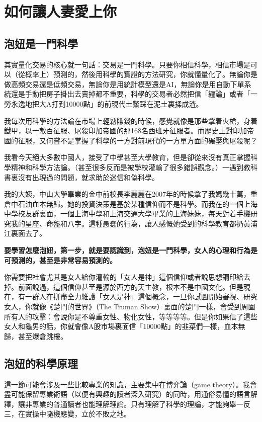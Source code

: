 \chapter{如何讓人妻愛上你}

\section{泡妞是一門科學}

其實量化交易的核心就一句話：交易是一門科學。只要你相信科學，相信市場是可以（從概率上）預測的，然後用科學的實證的方法研究，你就懂量化了。無論你是做高頻交易還是低頻交易，無論你是用統計模型還是AI，無論你是用自動下單系統還是手動把房子掛出去賣掉都不重要，科學的交易者必然把信「纏論」或者「一勞永逸地把大A打到10000點」的前現代土鱉踩在泥土裏揉成渣。

我每次用科學的方法論在市場上輕鬆賺錢的時候，感覺就像是那些拿着火槍，身着鐵甲，以一敵百征服、屠殺印加帝國的那168名西班牙征服者。而歷史上對印加帝國的征服，又何嘗不是掌握了科學的一方對前現代的一方單方面的碾壓與屠殺呢？

我看今天絕大多數中國人，接受了中學甚至大學教育，但是卻從來沒有真正掌握科學精神和科學方法論。（甚至很多反而是被學校灌輸了很多錯誤觀念。）一遇到教科書裏沒有出現過的問題，就求助於迷信和偽科學。

我的大姨，中山大學畢業的金中前校長李麗麗在2007年的時候拿了我媽幾十萬，重倉中石油血本無歸。她的投資決策是基於某種信仰而不是科學。而我在的一個上海中學校友群裏面，一個上海中學和上海交通大學畢業的上海妹妹，每天對着手機研究我的星座、命盤和八字。這種愚蠢的行為，讓人感慨她受到的科學教育都扔黃浦江裏面去了。

\textbf{要學習怎麼泡妞，第一步，就是要認識到，泡妞是一門科學，女人的心理和行為是可預測的，甚至是非常容易預測的。}

你需要把社會尤其是女人給你灌輸的「女人是神」這個信仰或者說思想鋼印給去掉。前面說過，這個信仰甚至是源於西方的天主教，根本不是中國文化。但是現在，有一群人在拼盡全力維護「女人是神」這個概念，一旦你試圖開始審視、研究女人，你就像《楚門的世界》（The Truman Show）裏面的楚門一樣，會受到周圍所有人的攻擊：會說你是不尊重女性、物化女性，等等等等。但是你如果信了這些女人和龜男的話，你就會像A股市場裏面信「10000點」的韭菜們一樣，血本無歸，甚至爆倉跳樓。

\section{泡妞的科學原理}

這一節可能會涉及一些比較專業的知識，主要集中在博弈論（game theory）。我會盡可能保留專業術語（以便有興趣的讀者深入研究）的同時，用通俗易懂的語言解釋，讓非專業的普通讀者也能理解理論。只有理解了科學的理論，才能夠舉一反三，在實操中隨機應變，立於不敗之地。

